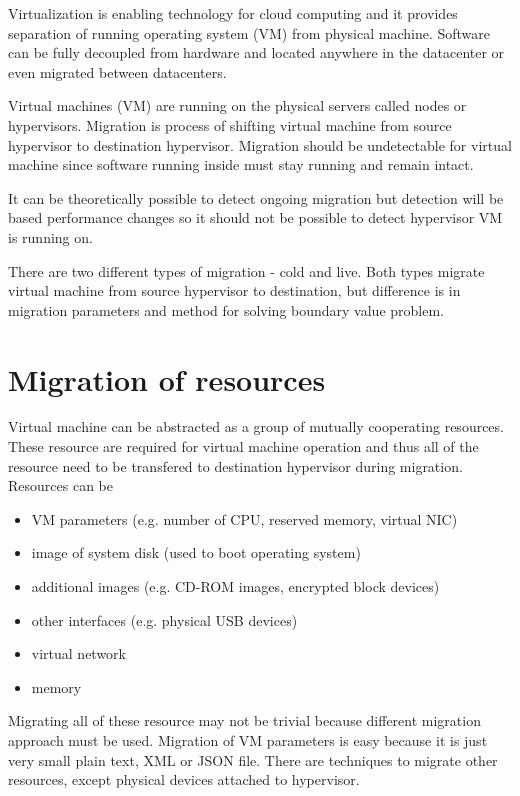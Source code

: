 


Virtualization is enabling technology for cloud computing and it provides separation of running operating system (\Ac{VM}) from physical machine. Software can be fully decoupled from hardware and located anywhere in the datacenter or even migrated between datacenters. 

Virtual machines (\Ac{VM}) are running on the physical servers called nodes or hypervisors. Migration is process of shifting virtual machine from source hypervisor to destination hypervisor. Migration should be undetectable for virtual machine since software running inside must stay running and remain intact. 

It can be theoretically possible to detect ongoing migration but detection will be based performance changes so it should not be possible to detect hypervisor \Ac{VM} is running on.


There are two different types of migration - cold and live. Both types migrate virtual machine from source hypervisor to destination, but difference is in migration parameters and method for solving boundary value problem.

\section{Migration of resources}
Virtual machine can be abstracted as a group of mutually cooperating resources. These resource are required for virtual machine operation and thus all of the resource need to be transfered to destination hypervisor during migration. Resources can be
\begin{itemize}
	\item \Ac{VM} parameters (e.g. number of \Ac{CPU}, reserved memory, virtual \Ac{NIC})
	\item image of system disk (used to boot operating system)
	\item additional images (e.g. CD-ROM images, encrypted block devices)
	\item other interfaces (e.g. physical \Ac{USB} devices)
	\item virtual network
	\item memory
\end{itemize}
Migrating all of these resource may not be trivial because different migration approach must be used. Migration of \Ac{VM} parameters is easy because it is just very small plain text, \Ac{XML} or \Ac{JSON} file. There are techniques to migrate other resources, except physical devices attached to hypervisor.

